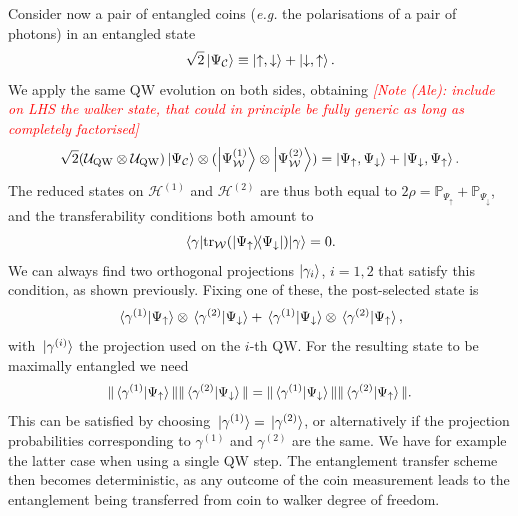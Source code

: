 \documentclass[
	aps, pra,
	superscriptaddress, twocolumn,
	floatfix,
	10pt
]{revtex4-1}
\newcommand{\on}[1]{\operatorname{#1}}
\newcommand{\parTitle}[1]{\noindent{\color{Mahogany}(\emph{#1})}}
\newcommand{\PP}{\mathbb{P}}
\newcommand{\calC}{{\mathcal{C}}}
\newcommand{\calH}{{\mathcal{H}}}
\newcommand{\calU}{{\mathcal{U}}}
\newcommand{\calW}{{\mathcal{W}}}
\newcommand{\commale}[1]{{\textcolor{red} {\it{[Note (Ale): #1]}}}}
\begin{document}
\parTitle{Pair of QWs}
Consider now a pair of entangled coins (\emph{e.g.} the polarisations of a pair of photons) in an entangled state
\begin{equation}
	\sqrt2\ket{\Psi_{\calC}}\equiv \ket{\uparrow,\downarrow} + \ket{\downarrow,\uparrow}.
\end{equation}
We apply the same QW evolution on both sides, obtaining \commale{include on LHS the walker state, that could in principle be fully generic as long as completely factorised}
\begin{equation}
	\sqrt2(\calU_{\on{QW}}\otimes \calU_{\on{QW}}) \ket{\Psi_{\calC}}\otimes(\ket{\Psi^{(1)}_{\calW}}\otimes \ket{\Psi^{(2)}_{\calW}}) =
	\ket{\Psi_\uparrow,\Psi_\downarrow} +
	\ket{\Psi_\downarrow,\Psi_\uparrow}.
\end{equation}
The reduced states on $\calH^{(1)}$ and $\calH^{(2)}$ are thus both equal to
	$2\rho = \PP_{\Psi_\uparrow} + \PP_{\Psi_\downarrow}$,
and the transferability conditions both amount to
\begin{equation}
	\mel{\gamma}{\tr_{\calW}(\ketbra{\Psi_\uparrow}{\Psi_\downarrow})}{\gamma} = 0.
\end{equation}
We can always find two orthogonal projections $\ket{\gamma_i}$, $i=1,2$ that satisfy this condition, as shown previously.
Fixing one of these, the post-selected state is
\begin{equation}
	\braket*{\gamma^{(1)}}{\Psi_\uparrow}\otimes \braket*{\gamma^{(2)}}{\Psi_\downarrow}
	+
	\braket*{\gamma^{(1)}}{\Psi_\downarrow}\otimes \braket*{\gamma^{(2)}}{\Psi_\uparrow},
\end{equation}
with $\ket*{\gamma^{(i)}}$ the projection used on the $i$-th QW.
For the resulting state to be maximally entangled we need
\begin{equation}\scalebox{0.96}{$\displaystyle
	\|\braket*{\gamma^{(1)}}{\Psi_\uparrow}\|
	\|\braket*{\gamma^{(2)}}{\Psi_\downarrow}\|
	=
	\|\braket*{\gamma^{(1)}}{\Psi_\downarrow}\|
	\|\braket*{\gamma^{(2)}}{\Psi_\uparrow}\|.
$}\end{equation}
This can be satisfied by choosing $\ket*{\gamma^{(1)}}=\ket*{\gamma^{(2)}}$, or alternatively if the projection probabilities corresponding to $\gamma^{(1)}$ and $\gamma^{(2)}$ are the same.
We have for example the latter case when using a single QW step.
The entanglement transfer scheme then becomes deterministic, as any outcome of the coin measurement leads to the entanglement being transferred from coin to walker degree of freedom.
\end{document}
